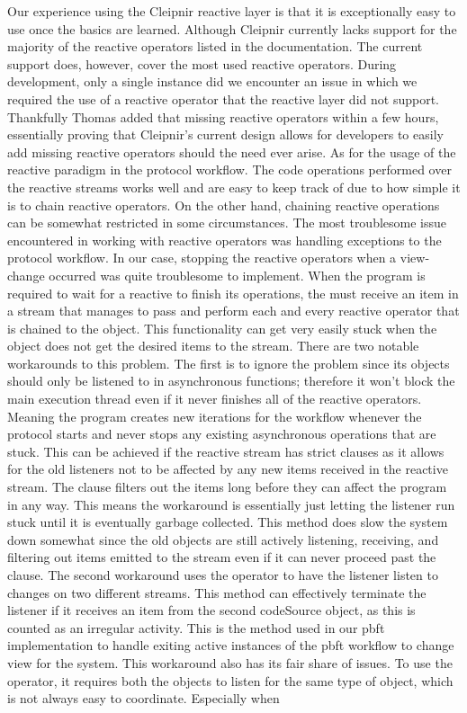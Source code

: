 Our experience using the Cleipnir reactive layer is that it is exceptionally easy to use once the basics are learned. Although Cleipnir currently lacks support for the majority of the reactive operators listed in the documentation. The current support does, however, cover the most used reactive operators. During development, only a single instance did we encounter an issue in which we required the use of a reactive operator that the reactive layer did not support. Thankfully Thomas added that missing reactive operators within a few hours, essentially proving that Cleipnir’s current design allows for developers to easily add missing reactive operators should the need ever arise. As for the usage of the reactive paradigm in the protocol workflow. The code operations performed over the reactive streams works well and are easy to keep track of due to how simple it is to chain reactive operators. On the other hand, chaining reactive operations can be somewhat restricted in some circumstances. The most troublesome issue encountered in working with reactive operators was handling exceptions to the protocol workflow. In our case, stopping the reactive operators when a view-change occurred was quite troublesome to implement. When the program is required to wait for a reactive  to finish its operations, the  must receive an item in a stream that manages to pass and perform each and every reactive operator that is chained to the  object. This functionality can get very easily stuck when the  object does not get the desired items to the stream. There are two notable workarounds to this problem. The first is to ignore the problem since its  objects should only be listened to in  asynchronous functions; therefore it won’t block the main execution thread even if it never finishes all of the reactive operators. Meaning the program creates new iterations for the workflow whenever the protocol starts and never stops any existing asynchronous operations that are stuck. This can be achieved if the reactive stream has strict  clauses as it allows for the old listeners not to be affected by any new items received in the reactive stream. The  clause filters out the items long before they can affect the program in any way. This means the workaround is essentially just letting the listener run stuck until it is eventually garbage collected. This method does slow the system down somewhat since the old  objects are still actively listening, receiving, and filtering out items emitted to the stream even if it can never proceed past the  clause. The second workaround uses the  operator to have the listener listen to changes on two different streams. This method can effectively terminate the listener if it receives an item from the second code{Source} object, as this is counted as an irregular activity. This is the method used in our \ac{pbft} implementation to handle exiting active instances of the \ac{pbft} workflow to change view for the system. This workaround also has its fair share of issues. To use the  operator, it requires both the  objects to listen for the same type of object, which is not always easy to coordinate. Especially when 